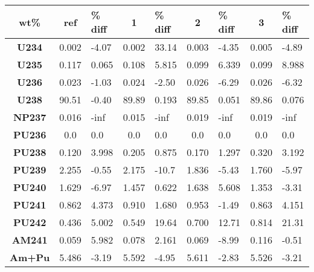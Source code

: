 	\begin{tabular}{c|ca|ca|ca|ca}
		\hline
		\textbf{wt\%} & \textbf{ref}  & \textbf{\% diff} & \textbf{1} & \textbf{\% diff} & \textbf{2} & \textbf{\% diff} & \textbf{3} & \textbf{\% diff}\\ 
		\hline
		\textbf{U234} & 0.002 & -4.07 & 0.002 & 33.14 & 0.003 & -4.35 & 0.005 & -4.89 \\ 
		\textbf{U235} & 0.117 & 0.065 & 0.108 & 5.815 & 0.099 & 6.339 & 0.099 & 8.988 \\ 
		\textbf{U236} & 0.023 & -1.03 & 0.024 & -2.50 & 0.026 & -6.29 & 0.026 & -6.32 \\ 
		\textbf{U238} & 90.51 & -0.40 & 89.89 & 0.193 & 89.85 & 0.051 & 89.86 & 0.076 \\ 
		\textbf{NP237} & 0.016 & -inf & 0.015 & -inf & 0.019 & -inf & 0.019 & -inf \\ 
		\textbf{PU236} & 0.0 & 0.0 & 0.0 & 0.0 & 0.0 & 0.0 & 0.0 & 0.0 \\ 
		\textbf{PU238} & 0.120 & 3.998 & 0.205 & 0.875 & 0.170 & 1.297 & 0.320 & 3.192 \\ 
		\textbf{PU239} & 2.255 & -0.55 & 2.175 & -10.7 & 1.836 & -5.43 & 1.760 & -5.97 \\ 
		\textbf{PU240} & 1.629 & -6.97 & 1.457 & 0.622 & 1.638 & 5.608 & 1.353 & -3.31 \\ 
		\textbf{PU241} & 0.862 & 4.373 & 0.910 & 1.680 & 0.953 & -1.49 & 0.863 & 4.151 \\ 
		\textbf{PU242} & 0.436 & 5.002 & 0.549 & 19.64 & 0.700 & 12.71 & 0.814 & 21.31 \\ 
		\textbf{AM241} & 0.059 & 5.982 & 0.078 & 2.161 & 0.069 & -8.99 & 0.116 & -0.51 \\ 
		\hline
		\hline
		\textbf{Am+Pu} & 5.486 & -3.19 & 5.592 & -4.95 & 5.611 & -2.83 & 5.526 & -3.21 \\ 
		\hline 
	\end{tabular} 
